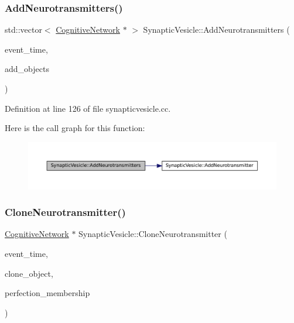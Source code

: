 \subsubsection{\texorpdfstring{Add\+Neurotransmitters()}{AddNeurotransmitters()}}
{\footnotesize\ttfamily std\+::vector$<$ \mbox{\hyperlink{class_cognitive_network}{Cognitive\+Network}} $\ast$ $>$ Synaptic\+Vesicle\+::\+Add\+Neurotransmitters (\begin{DoxyParamCaption}\item[{std\+::chrono\+::time\+\_\+point$<$ \mbox{\hyperlink{universe_8h_a0ef8d951d1ca5ab3cfaf7ab4c7a6fd80}{Clock}} $>$}]{event\+\_\+time,  }\item[{std\+::vector$<$ \mbox{\hyperlink{class_cognitive_network}{Cognitive\+Network}} $\ast$$>$}]{add\+\_\+objects }\end{DoxyParamCaption})}



Definition at line 126 of file synapticvesicle.\+cc.

Here is the call graph for this function\+:\nopagebreak
\begin{figure}[H]
\begin{center}
\leavevmode
\includegraphics[width=350pt]{class_synaptic_vesicle_ac924e6b7b824066a89136e52f2d5ce80_cgraph}
\end{center}
\end{figure}
\mbox{\label{class_synaptic_vesicle_aa811e68d1a3220c07140847eb3ebc8b3}} 
\subsubsection{\texorpdfstring{Clone\+Neurotransmitter()}{CloneNeurotransmitter()}}
{\footnotesize\ttfamily \mbox{\hyperlink{class_cognitive_network}{Cognitive\+Network}} $\ast$ Synaptic\+Vesicle\+::\+Clone\+Neurotransmitter (\begin{DoxyParamCaption}\item[{std\+::chrono\+::time\+\_\+point$<$ \mbox{\hyperlink{universe_8h_a0ef8d951d1ca5ab3cfaf7ab4c7a6fd80}{Clock}} $>$}]{event\+\_\+time,  }\item[{\mbox{\hyperlink{class_cognitive_network}{Cognitive\+Network}} $\ast$}]{clone\+\_\+object,  }\item[{double}]{perfection\+\_\+membership }\end{DoxyParamCaption})}



